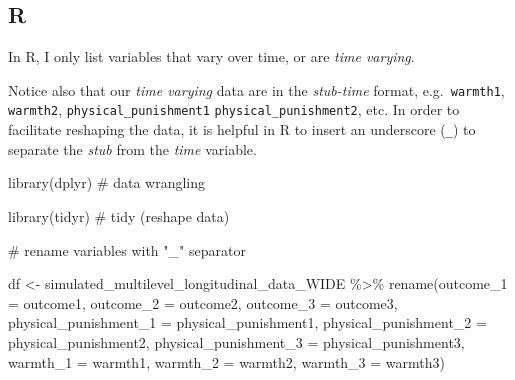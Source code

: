 \documentclass[
  letterpaper,
  DIV=11,
  numbers=noendperiod]{scrreprt}
\newenvironment{Shaded}{\begin{snugshade}}{\end{snugshade}}
\newcommand{\AttributeTok}[1]{\textcolor[rgb]{0.40,0.45,0.13}{#1}}
\newcommand{\CommentTok}[1]{\textcolor[rgb]{0.37,0.37,0.37}{#1}}
\newcommand{\FunctionTok}[1]{\textcolor[rgb]{0.28,0.35,0.67}{#1}}
\newcommand{\NormalTok}[1]{\textcolor[rgb]{0.00,0.23,0.31}{#1}}
\newcommand{\OtherTok}[1]{\textcolor[rgb]{0.00,0.23,0.31}{#1}}
\newcommand{\SpecialCharTok}[1]{\textcolor[rgb]{0.37,0.37,0.37}{#1}}
\begin{document}
\subsection{R}

In R, I only list variables that vary over time, or are \emph{time
varying}.

Notice also that our \emph{time varying} data are in the
\emph{stub-time} format, e.g.~\texttt{warmth1}, \texttt{warmth2},
\texttt{physical\_punishment1} \texttt{physical\_punishment2}, etc. In
order to facilitate reshaping the data, it is helpful in R to insert an
underscore (\texttt{\_}) to separate the \emph{stub} from the
\emph{time} variable.

\begin{Shaded}
\begin{Highlighting}[]
\FunctionTok{library}\NormalTok{(dplyr) }\CommentTok{\# data wrangling}

\FunctionTok{library}\NormalTok{(tidyr) }\CommentTok{\# tidy (reshape data)}
\end{Highlighting}
\end{Shaded}

\begin{Shaded}
\begin{Highlighting}[]
\CommentTok{\# rename variables with "\_" separator}

\NormalTok{df }\OtherTok{\textless{}{-}}\NormalTok{ simulated\_multilevel\_longitudinal\_data\_WIDE }\SpecialCharTok{\%\textgreater{}\%}
  \FunctionTok{rename}\NormalTok{(}\AttributeTok{outcome\_1 =}\NormalTok{ outcome1,}
         \AttributeTok{outcome\_2 =}\NormalTok{ outcome2,}
         \AttributeTok{outcome\_3 =}\NormalTok{ outcome3,}
         \AttributeTok{physical\_punishment\_1 =}\NormalTok{ physical\_punishment1,}
         \AttributeTok{physical\_punishment\_2 =}\NormalTok{ physical\_punishment2,}
         \AttributeTok{physical\_punishment\_3 =}\NormalTok{ physical\_punishment3,}
         \AttributeTok{warmth\_1 =}\NormalTok{ warmth1,}
         \AttributeTok{warmth\_2 =}\NormalTok{ warmth2,}
         \AttributeTok{warmth\_3 =}\NormalTok{ warmth3) }
\end{Highlighting}
\end{Shaded}
\end{document}

